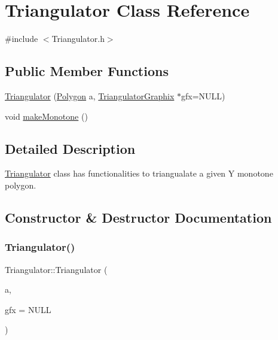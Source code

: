 \hypertarget{classTriangulator}{}\section{Triangulator Class Reference}
\label{classTriangulator}


{\ttfamily \#include $<$Triangulator.\+h$>$}

\subsection*{Public Member Functions}
\begin{DoxyCompactItemize}
\item 
\hyperlink{classTriangulator_a9a06293fd9de3065bb7d999807859e66}{Triangulator} (\hyperlink{classPolygon}{Polygon} a, \hyperlink{classTriangulatorGraphix}{Triangulator\+Graphix} $\ast$gfx=N\+U\+LL)
\item 
void \hyperlink{classTriangulator_aaf5c2efd036eb83c81d085b1f0b267ab}{make\+Monotone} ()
\end{DoxyCompactItemize}


\subsection{Detailed Description}
\hyperlink{classTriangulator}{Triangulator} class has functionalities to triangualate a given Y monotone polygon. 

\subsection{Constructor \& Destructor Documentation}
\mbox{\label{classTriangulator_a9a06293fd9de3065bb7d999807859e66}} 
\subsubsection{\texorpdfstring{Triangulator()}{Triangulator()}}
{\footnotesize\ttfamily Triangulator\+::\+Triangulator (\begin{DoxyParamCaption}\item[{\hyperlink{classPolygon}{Polygon}}]{a,  }\item[{\hyperlink{classTriangulatorGraphix}{Triangulator\+Graphix} $\ast$}]{gfx = {\ttfamily NULL} }\end{DoxyParamCaption})}

